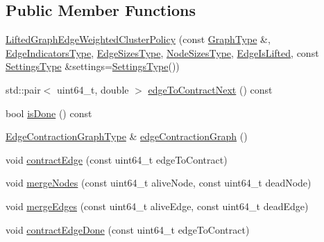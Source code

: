 \subsection*{Public Member Functions}
\begin{DoxyCompactItemize}
\item 
\hyperlink{classnifty_1_1graph_1_1agglo_1_1LiftedGraphEdgeWeightedClusterPolicy_ab7ae607d3f0b14dea37488433e97c91d}{Lifted\+Graph\+Edge\+Weighted\+Cluster\+Policy} (const \hyperlink{classnifty_1_1graph_1_1agglo_1_1LiftedGraphEdgeWeightedClusterPolicy_ae3d069ea1fd066a37e1c816c0bf50b83}{Graph\+Type} \&, \hyperlink{classnifty_1_1graph_1_1agglo_1_1LiftedGraphEdgeWeightedClusterPolicy_ad0813aa75f1e76d10b794cab88615f61}{Edge\+Indicators\+Type}, \hyperlink{classnifty_1_1graph_1_1agglo_1_1LiftedGraphEdgeWeightedClusterPolicy_ad63cc4f759cd05f1bf9b7fec48629221}{Edge\+Sizes\+Type}, \hyperlink{classnifty_1_1graph_1_1agglo_1_1LiftedGraphEdgeWeightedClusterPolicy_a83ef319d77186be2fc3957ed06f0a8f1}{Node\+Sizes\+Type}, \hyperlink{classnifty_1_1graph_1_1agglo_1_1LiftedGraphEdgeWeightedClusterPolicy_ad104d8984e0964ccfb7d1ec06ee977a2}{Edge\+Is\+Lifted}, const \hyperlink{classnifty_1_1graph_1_1agglo_1_1LiftedGraphEdgeWeightedClusterPolicy_a7bf0e26a2c4776e866807429e912084b}{Settings\+Type} \&settings=\hyperlink{classnifty_1_1graph_1_1agglo_1_1LiftedGraphEdgeWeightedClusterPolicy_a7bf0e26a2c4776e866807429e912084b}{Settings\+Type}())
\item 
std\+::pair$<$ uint64\+\_\+t, double $>$ \hyperlink{classnifty_1_1graph_1_1agglo_1_1LiftedGraphEdgeWeightedClusterPolicy_ac27f4726c16aaa1f77b68a318a13d681}{edge\+To\+Contract\+Next} () const 
\item 
bool \hyperlink{classnifty_1_1graph_1_1agglo_1_1LiftedGraphEdgeWeightedClusterPolicy_a7e11bb64b33cf2123c48eb46d9feebf5}{is\+Done} () const 
\item 
\hyperlink{classnifty_1_1graph_1_1agglo_1_1LiftedGraphEdgeWeightedClusterPolicy_a316c395d0d3bcc00ddbed21302419354}{Edge\+Contraction\+Graph\+Type} \& \hyperlink{classnifty_1_1graph_1_1agglo_1_1LiftedGraphEdgeWeightedClusterPolicy_a95287f99bc3b86ccbed7dcd9c8851628}{edge\+Contraction\+Graph} ()
\item 
void \hyperlink{classnifty_1_1graph_1_1agglo_1_1LiftedGraphEdgeWeightedClusterPolicy_a56bc42922fcf00d486cfebca957c18ab}{contract\+Edge} (const uint64\+\_\+t edge\+To\+Contract)
\item 
void \hyperlink{classnifty_1_1graph_1_1agglo_1_1LiftedGraphEdgeWeightedClusterPolicy_a0a8e7d91a8393b6c9d350bc69305bedf}{merge\+Nodes} (const uint64\+\_\+t alive\+Node, const uint64\+\_\+t dead\+Node)
\item 
void \hyperlink{classnifty_1_1graph_1_1agglo_1_1LiftedGraphEdgeWeightedClusterPolicy_a033e17251eb1e313f930a53a3c73a002}{merge\+Edges} (const uint64\+\_\+t alive\+Edge, const uint64\+\_\+t dead\+Edge)
\item 
void \hyperlink{classnifty_1_1graph_1_1agglo_1_1LiftedGraphEdgeWeightedClusterPolicy_aa5bcb1829765b56a0fc10a82be501cc0}{contract\+Edge\+Done} (const uint64\+\_\+t edge\+To\+Contract)
\end{DoxyCompactItemize}
